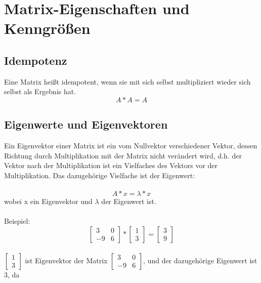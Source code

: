 \documentclass[11pt]{scrreprt}
\begin{document}
\section{Matrix-Eigenschaften und Kenngrößen}
\subsection{Idempotenz}
Eine Matrix heißt idempotent, wenn sie mit sich selbst multipliziert wieder sich selbst als Ergebnis hat.
\begin{equation}
A * A = A
\end{equation}
\subsection{Eigenwerte und Eigenvektoren}
 Ein Eigenvektor einer Matrix ist ein vom Nullvektor verschiedener Vektor, dessen Richtung durch Multiplikation mit der Matrix nicht verändert wird, d.h. der Vektor nach der Multiplikation ist ein Vielfaches des Vektors vor der Multiplikation. Das dazugehörige Vielfache ist der Eigenwert:\\
\\
\begin{equation}
A * x = \lambda * x
\end{equation}
wobei x ein Eigenvektor und  $\lambda$  der Eigenwert ist.\\
\\
Beispiel:
\begin{equation}
\begin{bmatrix}
3  & 0\\
-9 & 6 
\end {bmatrix}
*
\begin{bmatrix}
1 \\ 
3  
\end {bmatrix}
=
\begin{bmatrix}
3 \\
9  
\end {bmatrix}
\end{equation}
\\
$\begin{bmatrix}
1 \\ 
3  
\end {bmatrix}$ ist Eigenvektor der Matrix $\begin{bmatrix}
3  & 0 \\
-9 & 6 
\end {bmatrix}$, und der dazugehörige Eigenwert ist 3, da \\
\\
\end{document}
